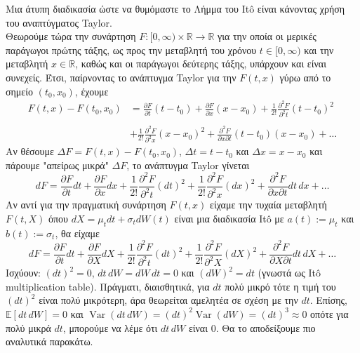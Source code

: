 \documentclass[12pt,a4paper,twoside,openany]{book}
\begin{document}
	\noindent Μια άτυπη διαδικασία ώστε να θυμόμαστε το Λήμμα του Itô είναι κάνοντας χρήση του αναπτύγματος Taylor.\\
	\noindent Θεωρούμε τώρα την συνάρτηση $F:[0,\infty)\times\mathbb{R}\rightarrow\mathbb{R}$ για την οποία οι μερικές παράγωγοι πρώτης τάξης, ως προς την μεταβλητή του χρόνου $t\in[0,\infty)$ και την μεταβλητή $x\in\mathbb{R}$, καθώς και οι παράγωγοι δεύτερης τάξης, υπάρχουν και είναι συνεχείς. Έτσι, παίρνοντας το ανάπτυγμα Taylor για την $F(t,x)$ γύρω από το σημείο $(t_0,x_0)$, έχουμε
	\begin{align*}
		F(t,x)- F(t_0,x_0) &= \frac{\partial F}{\partial t}(t-t_0) + \frac{\partial F}{\partial x}(x-x_0) +\frac{1}{2!} \frac{\partial^2 F}{\partial^2 t}(t-t_0)^2 \\\\ &+ \frac{1}{2!} \frac{\partial^2 F}{\partial^2 x}(x-x_0)^2 + \frac{\partial^2 F}{\partial x\partial t}(t-t_0)(x-x_0) +\dots
	\end{align*}
	Αν θέσουμε $\Delta F= F(t,x)- F(t_0,x_0)$, $\Delta t=t-t_0$ και $\Delta x=x-x_0$ και πάρουμε "απείρως μικρά" $\Delta F$, το ανάπτυγμα Taylor γίνεται
	\[dF= \frac{\partial F}{\partial t} dt + \frac{\partial F}{\partial x}dx + \frac{1}{2!} \frac{\partial^2 F}{\partial^2 t}(dt)^2 + \frac{1}{2!} \frac{\partial^2 F}{\partial^2 x}(dx)^2 + \frac{\partial^2 F}{\partial x\partial t}dt \, dx +\dots \]
	Αν αντί για την πραγματική συνάρτηση $F(t,x)$ είχαμε την τυχαία μεταβλητή $F(t,X)$ όπου $dX=\mu_t dt +\sigma_t dW(t)$ είναι μια διαδικασία Itô με $a(t):=\mu_t$ και $b(t):=\sigma_t$, θα είχαμε
	\[dF= \frac{\partial F}{\partial t} dt + \frac{\partial F}{\partial X}dX + \frac{1}{2!} \frac{\partial^2 F}{\partial^2 t}(dt)^2 + \frac{1}{2!} \frac{\partial^2 F}{\partial^2 X}(dX)^2 + \frac{\partial^2 F}{\partial X\partial t}dt \, dX +\dots \]
	Ισχύουν: $(dt)^2=0$, $dt \, dW = dW \, dt = 0$ και $(dW)^2=dt$ (γνωστά ως Itô multiplication table). Πράγματι, διαισθητικά, για $dt$ πολύ μικρό τότε η τιμή του $(dt)^2$ είναι πολύ μικρότερη, άρα θεωρείται αμελητέα σε σχέση με την $dt$. Eπίσης, $\mathbb{E}[dt \, dW]= 0$ και $\operatorname{Var}(dt \, dW)= (dt)^2\operatorname{Var}(dW) = (dt)^3\approx0$ οπότε για πολύ μικρά $dt$, μπορούμε να λέμε ότι $dt\, dW$ είναι 0. Θα το αποδείξουμε πιο αναλυτικά παρακάτω.\\
\end{document}

